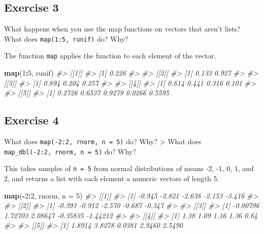 \documentclass[]{book}
\newenvironment{Shaded}{\begin{snugshade}}{\end{snugshade}}
\newcommand{\CommentTok}[1]{\textcolor[rgb]{0.56,0.35,0.01}{\textit{#1}}}
\newcommand{\DataTypeTok}[1]{\textcolor[rgb]{0.13,0.29,0.53}{#1}}
\newcommand{\DecValTok}[1]{\textcolor[rgb]{0.00,0.00,0.81}{#1}}
\newcommand{\KeywordTok}[1]{\textcolor[rgb]{0.13,0.29,0.53}{\textbf{#1}}}
\newcommand{\NormalTok}[1]{#1}
\newcommand{\OperatorTok}[1]{\textcolor[rgb]{0.81,0.36,0.00}{\textbf{#1}}}
\theoremstyle{plain}
\theoremstyle{remark}
\theoremstyle{definition}
\theoremstyle{definition}
\theoremstyle{definition}
\theoremstyle{remark}
\begin{document}
\hypertarget{exercise-3-46}{%
\subsection{Exercise 3}\label{exercise-3-46}}

What happens when you use the map functions on vectors that aren't
lists? What does \texttt{map(1:5,\ runif)} do? Why?

The function \texttt{map} applies the function to each element of the
vector.

\begin{Shaded}
\begin{Highlighting}[]
\KeywordTok{map}\NormalTok{(}\DecValTok{1}\OperatorTok{:}\DecValTok{5}\NormalTok{, runif)}
\CommentTok{#> [[1]]}
\CommentTok{#> [1] 0.226}
\CommentTok{#> }
\CommentTok{#> [[2]]}
\CommentTok{#> [1] 0.133 0.927}
\CommentTok{#> }
\CommentTok{#> [[3]]}
\CommentTok{#> [1] 0.894 0.204 0.257}
\CommentTok{#> }
\CommentTok{#> [[4]]}
\CommentTok{#> [1] 0.614 0.441 0.316 0.101}
\CommentTok{#> }
\CommentTok{#> [[5]]}
\CommentTok{#> [1] 0.2726 0.6537 0.9279 0.0266 0.5595}
\end{Highlighting}
\end{Shaded}

\hypertarget{exercise-4-34}{%
\subsection{Exercise 4}\label{exercise-4-34}}

What does \texttt{map(-2:2,\ rnorm,\ n\ =\ 5)} do? Why? \textgreater{}
What does \texttt{map\_dbl(-2:2,\ rnorm,\ n\ =\ 5)} do? Why?

This takes samples of \texttt{n\ =\ 5} from normal distributions of
means -2, -1, 0, 1, and 2, and returns a list with each element a
numeric vectors of length 5.

\begin{Shaded}
\begin{Highlighting}[]
\KeywordTok{map}\NormalTok{(}\OperatorTok{-}\DecValTok{2}\OperatorTok{:}\DecValTok{2}\NormalTok{, rnorm, }\DataTypeTok{n =} \DecValTok{5}\NormalTok{)}
\CommentTok{#> [[1]]}
\CommentTok{#> [1] -0.945 -2.821 -2.638 -2.153 -3.416}
\CommentTok{#> }
\CommentTok{#> [[2]]}
\CommentTok{#> [1] -0.393 -0.912 -2.570 -0.687 -0.347}
\CommentTok{#> }
\CommentTok{#> [[3]]}
\CommentTok{#> [1] -0.00796  1.72703  2.08647 -0.35835 -1.44212}
\CommentTok{#> }
\CommentTok{#> [[4]]}
\CommentTok{#> [1] 1.38 1.09 1.16 1.36 0.64}
\CommentTok{#> }
\CommentTok{#> [[5]]}
\CommentTok{#> [1] 1.8914 3.8278 0.0381 2.9460 2.5490}
\end{Highlighting}
\end{Shaded}
\end{document}
